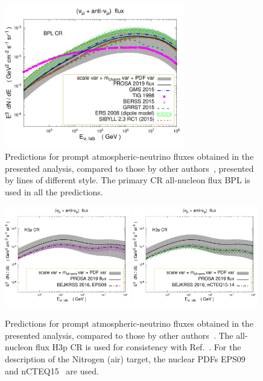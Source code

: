 \documentclass[12pt]{article}
\begin{document}
\begin{figure}
\centering
    \includegraphics[width=0.7\textwidth]{figs/fluxcompa1_extended_prosa19_py8.pdf}
  \caption{\label{fig4prompt} Predictions for prompt atmospheric-neutrino fluxes obtained in the presented analysis, compared to those by other authors~\cite{Garzelli:2015psa, Gondolo:1995fq, Enberg:2008te, Bhattacharya:2015jpa, Gauld:2015kvh, Fedynitch:2015zma}, presented by lines of different style. The primary CR all-nucleon flux BPL is used in all the predictions.}
\end{figure}

\begin{figure}
\centering
    \includegraphics[width=0.49\textwidth]{figs/fluxcompa_prosa19nuovibatta1_py8.pdf}
    \includegraphics[width=0.49\textwidth]{figs/fluxcompa_prosa19nuovibatta2_py8.pdf}
  \caption{\label{fig5prompt} Predictions for prompt atmospheric-neutrino fluxes obtained in the presented analysis, compared to those by other authors~\cite{Bhattacharya:2016jce}. The all-nucleon flux H3p CR is used for consistency with Ref.~\cite{Bhattacharya:2016jce}. 
For the description of the Nitrogen (air) target, the nuclear PDFs EPS09~\cite{Eskola:2009uj} and nCTEQ15~\cite{Kovarik:2015cma} are used.}
\end{figure}
\end{document}
